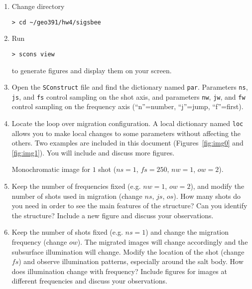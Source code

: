 \begin{enumerate}
\item Change directory 

\begin{verbatim}
> cd ~/geo391/hw4/sigsbee
\end{verbatim}
  \item Run
\begin{verbatim}
> scons view
\end{verbatim}
to generate figures and display them on your screen.  

\item
Open the \texttt{SConstruct} file and 
find the dictionary named \texttt{par}.
Parameters 
\texttt{ns}, 
\texttt{js}, and
\texttt{fs} control sampling on the shot axis,
and parameters 
\texttt{nw}, 
\texttt{jw}, and 
\texttt{fw} control sampling on the 
frequency axis (``n''=number, ``j''=jump, ``f''=first).

\item
Locate the loop over migration configuration.
A local dictionary  named \texttt{loc} allows you to 
make local changes to some parameters without affecting
the others.
Two examples are included in this document
(Figures~\ref{fig:img0} and \ref{fig:img1}).
You will include and discuss more figures.

{Monochromatic image for $1$ shot 
($ns=1$, $fs=250$, $nw=1$, $ow=2$).}


\item
Keep the number of frequencies fixed 
(e.g. $nw=1$, $ow=2$),
and modify the number of shots used in migration
(change $ns$, $js$, $os$).
How many shots do you need in order to see the main 
features of the structure?
Can you identify the structure?
Include a new figure and discuss your observations.



\item
Keep the number of shots fixed (e.g. $ns=1$) 
and change the migration frequency (change $ow$).
The migrated images will change accordingly and
the subsurface illumination will change.
Modify the location of the shot (change $fs$)
and observe illumination patterns, especially around
the salt body.
How does illumination change with frequency?
Include figures for images at different frequencies
and discuss your observations.


\end{enumerate}

